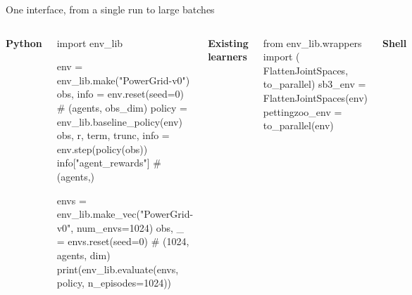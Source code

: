 \documentclass[10pt,aspectratio=169]{beamer}
\begin{document}
\begin{frame}[fragile]{One interface, from a single run to large batches}
  \begin{columns}[T,onlytextwidth]
    \footnotesize\textbf{Python}\\[2pt]
\begin{pycode}
import env_lib

env = env_lib.make("PowerGrid-v0")
obs, info = env.reset(seed=0)    # (agents, obs_dim)
policy = env_lib.baseline_policy(env)
obs, r, term, trunc, info = env.step(policy(obs))
info["agent_rewards"]            # (agents,)

envs = env_lib.make_vec("PowerGrid-v0", num_envs=1024)
obs, _ = envs.reset(seed=0)      # (1024, agents, dim)
print(env_lib.evaluate(envs, policy, n_episodes=1024))
\end{pycode}
    \footnotesize\textbf{Existing learners}\\[2pt]
\begin{pycode}
from env_lib.wrappers import (
  FlattenJointSpaces, to_parallel)
sb3_env = FlattenJointSpaces(env)
pettingzoo_env = to_parallel(env)
\end{pycode}
    \vspace{6pt}
    \textbf{Shell}\\[2pt]
  \end{columns}
\end{frame}
\end{document}

